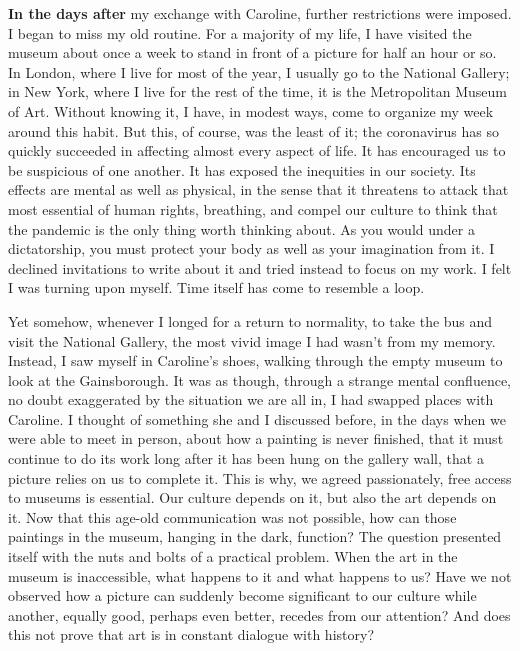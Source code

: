 \textbf{In the days after} my exchange with Caroline, further
restrictions were imposed. I began to miss my old routine. For a
majority of my life, I have visited the museum about once a week to
stand in front of a picture for half an hour or so. In London, where I
live for most of the year, I usually go to the National Gallery; in New
York, where I live for the rest of the time, it is the Metropolitan
Museum of Art. Without knowing it, I have, in modest ways, come to
organize my week around this habit. But this, of course, was the least
of it; the coronavirus has so quickly succeeded in affecting almost
every aspect of life. It has encouraged us to be suspicious of one
another. It has exposed the inequities in our society. Its effects are
mental as well as physical, in the sense that it threatens to attack
that most essential of human rights, breathing, and compel our culture
to think that the pandemic is the only thing worth thinking about. As
you would under a dictatorship, you must protect your body as well as
your imagination from it. I declined invitations to write about it and
tried instead to focus on my work. I felt I was turning upon myself.
Time itself has come to resemble a loop.

Yet somehow, whenever I longed for a return to normality, to take the
bus and visit the National Gallery, the most vivid image I had wasn't
from my memory. Instead, I saw myself in Caroline's shoes, walking
through the empty museum to look at the Gainsborough. It was as though,
through a strange mental confluence, no doubt exaggerated by the
situation we are all in, I had swapped places with Caroline. I thought
of something she and I discussed before, in the days when we were able
to meet in person, about how a painting is never finished, that it must
continue to do its work long after it has been hung on the gallery wall,
that a picture relies on us to complete it. This is why, we agreed
passionately, free access to museums is essential. Our culture depends
on it, but also the art depends on it. Now that this age-old
communication was not possible, how can those paintings in the museum,
hanging in the dark, function? The question presented itself with the
nuts and bolts of a practical problem. When the art in the museum is
inaccessible, what happens to it and what happens to us? Have we not
observed how a picture can suddenly become significant to our culture
while another, equally good, perhaps even better, recedes from our
attention? And does this not prove that art is in constant dialogue with
history?

